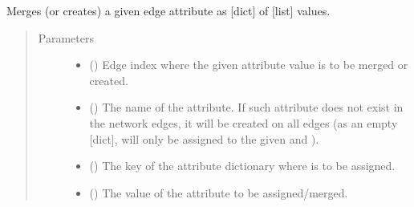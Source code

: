 \documentclass[letterpaper,10pt,english]{sphinxmanual}
\begin{document}
\begin{fulllineitems}

\begin{fulllineitems}
\label{\detokenize{reference:pypath.main.PyPath.add_grouped_eattr}}
Merges (or creates) a given edge attribute as {[}dict{]} of {[}list{]}
values.
\begin{quote}\begin{description}
\item[{Parameters}] \leavevmode\begin{itemize}
\item {} 
 () \textendash{} Edge index where the given attribute value is to be merged
or created.

\item {} 
 () \textendash{} The name of the attribute. If such attribute does not exist
in the network edges, it will be created on all edges (as an
empty {[}dict{]},  will only be assigned to the given
 and ).

\item {} 
 () \textendash{} The key of the attribute dictionary where  is to be
assigned.

\item {} 
 () \textendash{} The value of the attribute to be assigned/merged.

\end{itemize}

\end{description}\end{quote}

\end{fulllineitems}



\end{fulllineitems}
\end{document}
